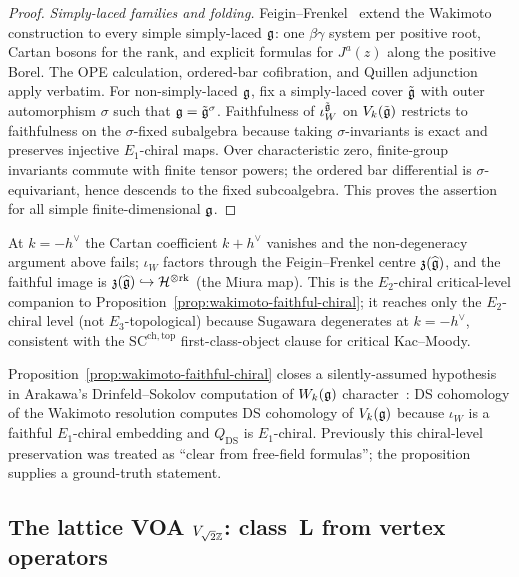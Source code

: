 \begin{proof}
\emph{Simply-laced families and folding.}
Feigin--Frenkel~\cite{FF92} extend the Wakimoto construction
to every simple simply-laced $\mathfrak{g}$: one $\beta\gamma$ system
per positive root, Cartan bosons for the rank, and explicit
formulas for $J^a(z)$ along the positive Borel. The OPE
calculation, ordered-bar cofibration, and Quillen adjunction
apply verbatim. For non-simply-laced $\mathfrak{g}$, fix a
simply-laced cover $\tilde{\mathfrak{g}}$ with outer automorphism
$\sigma$ such that $\mathfrak{g} = \tilde{\mathfrak{g}}^\sigma$. Faithfulness
of $\iota_W^{\tilde{\mathfrak{g}}}$ on $V_k(\tilde{\mathfrak{g}})$ restricts to
faithfulness on the $\sigma$-fixed subalgebra because taking
$\sigma$-invariants is exact and preserves injective
$E_1$-chiral maps. Over characteristic zero, finite-group
invariants commute with finite tensor powers; the ordered bar
differential is $\sigma$-equivariant, hence descends to the
fixed subcoalgebra. This proves the assertion for all
simple finite-dimensional $\mathfrak{g}$.
\end{proof}

\begin{remark}\label{rem:wakimoto-critical-level}
At $k = -h^\vee$ the Cartan coefficient $k+h^\vee$ vanishes
and the non-degeneracy argument above fails; $\iota_W$ factors
through the Feigin--Frenkel centre
$\mathfrak{z}(\widehat{\mathfrak{g}})$, and the faithful image is
$\mathfrak{z}(\widehat{\mathfrak{g}}) \hookrightarrow
\mathcal{H}^{\otimes\mathrm{rk}}$ (the Miura map). This is the
$E_2$-chiral critical-level companion to
Proposition~\ref{prop:wakimoto-faithful-chiral}; it reaches
only the $E_2$-chiral level (not $E_3$-topological) because
Sugawara degenerates at $k=-h^\vee$, consistent with the
$\mathrm{SC}^{\mathrm{ch,top}}$ first-class-object clause
for critical Kac--Moody.
\end{remark}

\begin{remark}\label{rem:wakimoto-ds-consequence}
Proposition~\ref{prop:wakimoto-faithful-chiral} closes a
silently-assumed hypothesis in Arakawa's
Drinfeld--Sokolov computation of $W_k(\mathfrak{g})$
character~\cite{Ara07}: DS cohomology of the Wakimoto
resolution computes DS cohomology of $V_k(\mathfrak{g})$ because
$\iota_W$ is a faithful $E_1$-chiral embedding and
$Q_{\mathrm{DS}}$ is $E_1$-chiral. Previously this chiral-level
preservation was treated as ``clear from free-field formulas'';
the proposition supplies a ground-truth statement.
\end{remark}

\subsection{The lattice VOA $V_{\sqrt{2}\mathbb{Z}}$: class~L from vertex operators}%
\label{subsec:lattice-voa-ordered-bar}%
%

